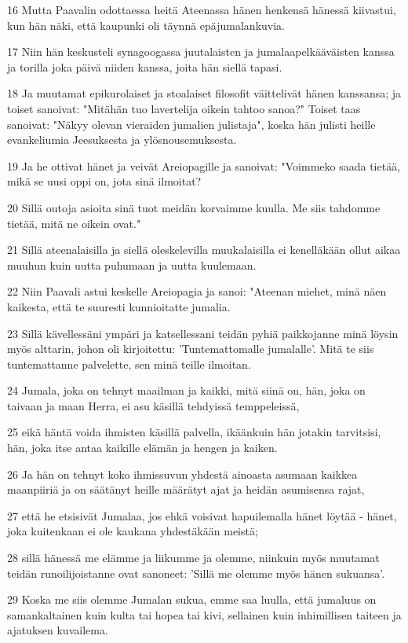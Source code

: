 \par 16 Mutta Paavalin odottaessa heitä Ateenassa hänen henkensä hänessä kiivastui, kun hän näki, että kaupunki oli täynnä epäjumalankuvia.
\par 17 Niin hän keskusteli synagoogassa juutalaisten ja jumalaapelkääväisten kanssa ja torilla joka päivä niiden kanssa, joita hän siellä tapasi.
\par 18 Ja muutamat epikurolaiset ja stoalaiset filosofit väittelivät hänen kanssansa; ja toiset sanoivat: "Mitähän tuo lavertelija oikein tahtoo sanoa?" Toiset taas sanoivat: "Näkyy olevan vieraiden jumalien julistaja", koska hän julisti heille evankeliumia Jeesuksesta ja ylösnousemuksesta.
\par 19 Ja he ottivat hänet ja veivät Areiopagille ja sanoivat: "Voimmeko saada tietää, mikä se uusi oppi on, jota sinä ilmoitat?
\par 20 Sillä outoja asioita sinä tuot meidän korvaimme kuulla. Me siis tahdomme tietää, mitä ne oikein ovat."
\par 21 Sillä ateenalaisilla ja siellä oleskelevilla muukalaisilla ei kenelläkään ollut aikaa muuhun kuin uutta puhumaan ja uutta kuulemaan.
\par 22 Niin Paavali astui keskelle Areiopagia ja sanoi: "Ateenan miehet, minä näen kaikesta, että te suuresti kunnioitatte jumalia.
\par 23 Sillä kävellessäni ympäri ja katsellessani teidän pyhiä paikkojanne minä löysin myös alttarin, johon oli kirjoitettu: 'Tuntemattomalle jumalalle'. Mitä te siis tuntemattanne palvelette, sen minä teille ilmoitan.
\par 24 Jumala, joka on tehnyt maailman ja kaikki, mitä siinä on, hän, joka on taivaan ja maan Herra, ei asu käsillä tehdyissä temppeleissä,
\par 25 eikä häntä voida ihmisten käsillä palvella, ikäänkuin hän jotakin tarvitsisi, hän, joka itse antaa kaikille elämän ja hengen ja kaiken.
\par 26 Ja hän on tehnyt koko ihmissuvun yhdestä ainoasta asumaan kaikkea maanpiiriä ja on säätänyt heille määrätyt ajat ja heidän asumisensa rajat,
\par 27 että he etsisivät Jumalaa, jos ehkä voisivat hapuilemalla hänet löytää - hänet, joka kuitenkaan ei ole kaukana yhdestäkään meistä;
\par 28 sillä hänessä me elämme ja liikumme ja olemme, niinkuin myös muutamat teidän runoilijoistanne ovat sanoneet: 'Sillä me olemme myös hänen sukuansa'.
\par 29 Koska me siis olemme Jumalan sukua, emme saa luulla, että jumaluus on samankaltainen kuin kulta tai hopea tai kivi, sellainen kuin inhimillisen taiteen ja ajatuksen kuvailema.
